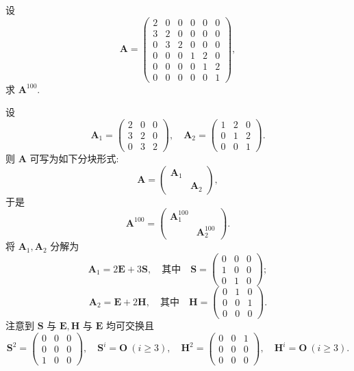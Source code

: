 \documentclass[../../main.tex]{subfiles}%
\begin{document}
\begin{example}
设
\[
\boldsymbol{A} = \begin{pmatrix} 2 & 0 & 0 & 0 & 0 & 0 \\ 3 & 2 & 0 & 0 & 0 & 0 \\ 0 & 3 & 2 & 0 & 0 & 0 \\ 0 & 0 & 0 & 1 & 2 & 0 \\ 0 & 0 & 0 & 0 & 1 & 2 \\ 0 & 0 & 0 & 0 & 0 & 1 \end{pmatrix},
\]
求 \(\boldsymbol{A}^{100}\).
\end{example}
\begin{solution}

设
\[
\boldsymbol{A}_1 = \begin{pmatrix} 2 & 0 & 0 \\ 3 & 2 & 0 \\ 0 & 3 & 2 \end{pmatrix}, \quad \boldsymbol{A}_2 = \begin{pmatrix} 1 & 2 & 0 \\ 0 & 1 & 2 \\ 0 & 0 & 1 \end{pmatrix}.
\]
则 \(\boldsymbol{A}\) 可写为如下分块形式:
\[
\boldsymbol{A} = \begin{pmatrix} \boldsymbol{A}_1 &  \\  & \boldsymbol{A}_2 \end{pmatrix},
\]
于是
\[
\boldsymbol{A}^{100} = \begin{pmatrix} \boldsymbol{A}_1^{100} &  \\  & \boldsymbol{A}_2^{100} \end{pmatrix}.
\]
将 \(\boldsymbol{A}_1, \boldsymbol{A}_2\) 分解为
\[
\boldsymbol{A}_1 = 2\boldsymbol{E} + 3\boldsymbol{S}, \quad \text{其中} \quad \boldsymbol{S} = \begin{pmatrix} 0 & 0 & 0 \\ 1 & 0 & 0 \\ 0 & 1 & 0 \end{pmatrix};
\]
\[
\boldsymbol{A}_2 = \boldsymbol{E} + 2\boldsymbol{H}, \quad \text{其中} \quad \boldsymbol{H} = \begin{pmatrix} 0 & 1 & 0 \\ 0 & 0 & 1 \\ 0 & 0 & 0 \end{pmatrix}.
\]
注意到 \(\boldsymbol{S}\) 与 \(\boldsymbol{E}, \boldsymbol{H}\) 与 \(\boldsymbol{E}\) 均可交换且
\[
\boldsymbol{S}^2 = \begin{pmatrix} 0 & 0 & 0 \\ 0 & 0 & 0 \\ 1 & 0 & 0 \end{pmatrix}, \quad \boldsymbol{S}^i = \boldsymbol{O} \ (i \geqslant 3), \quad \boldsymbol{H}^2 = \begin{pmatrix} 0 & 0 & 1 \\ 0 & 0 & 0 \\ 0 & 0 & 0 \end{pmatrix}, \quad \boldsymbol{H}^i = \boldsymbol{O} \ (i \geqslant 3).
\]
\end{solution}
\end{document}
